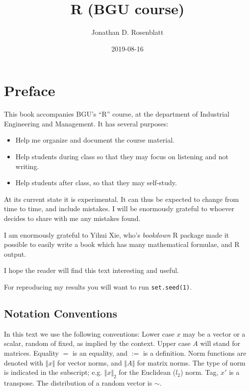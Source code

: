 \documentclass[]{book}
\title{R (BGU course)}
\author{Jonathan D. Rosenblatt}
\date{2019-08-16}
\providecommand{\tightlist}{%
  \setlength{\itemsep}{0pt}\setlength{\parskip}{0pt}}
\theoremstyle{definition}
\theoremstyle{definition}
\theoremstyle{definition}
\theoremstyle{remark}
\begin{document}
\maketitle

{
\setcounter{tocdepth}{1}
\tableofcontents
}
\chapter{Preface}\label{preface}

This book accompanies BGU's ``R'' course, at the department of
Industrial Engineering and Management. It has several purposes:

\begin{itemize}
\tightlist
\item
  Help me organize and document the course material.
\item
  Help students during class so that they may focus on listening and not
  writing.
\item
  Help students after class, so that they may self-study.
\end{itemize}

At its current state it is experimental. It can thus be expected to
change from time to time, and include mistakes. I will be enormously
grateful to whoever decides to share with me any mistakes found.

I am enormously grateful to Yihui Xie, who's \emph{bookdown} R package
made it possible to easily write a book which has many mathematical
formulae, and R output.

I hope the reader will find this text interesting and useful.

For reproducing my results you will want to run \texttt{set.seed(1)}.

\section{Notation Conventions}\label{notation-conventions}

In this text we use the following conventions: Lower case \(x\) may be a
vector or a scalar, random of fixed, as implied by the context. Upper
case \(A\) will stand for matrices. Equality \(=\) is an equality, and
\(:=\) is a definition. Norm functions are denoted with
\(\Vert x \Vert\) for vector norms, and \(\Vert A \Vert\) for matrix
norms. The type of norm is indicated in the subscript; e.g.
\(\Vert x \Vert_2\) for the Euclidean (\(l_2\)) norm. Tag, \(x'\) is a
transpose. The distribution of a random vector is \(\sim\).
\end{document}
